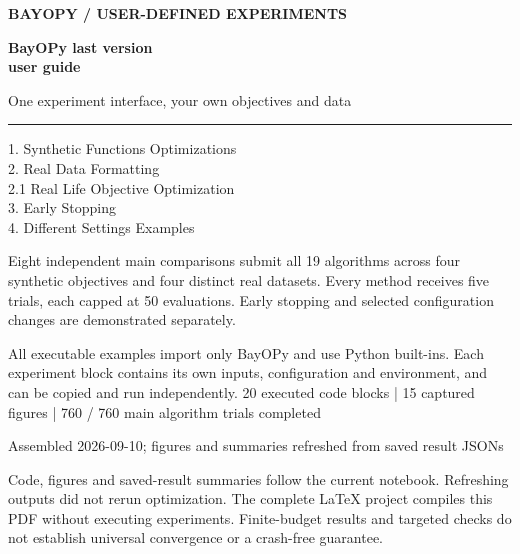 \documentclass[10pt,a4paper]{article}
\begin{document}
\begin{titlepage}
\vspace*{18mm}
{\small\bfseries\color{BayopyTeal}BAYOPY / USER-DEFINED EXPERIMENTS}\par
\vspace{12mm}
{\fontsize{34}{39}\selectfont\bfseries\color{BayopyInk}BayOPy last version\\user guide}\par
\vspace{5mm}
{\Large One experiment interface, your own objectives and data}\par
\vspace{9mm}
{\color{BayopyTeal}\rule{\linewidth}{2pt}}\par
\vspace{9mm}
1. Synthetic Functions Optimizations\\[5pt]
2. Real Data Formatting\\[5pt]
\hspace*{5mm}2.1 Real Life Objective Optimization\\[5pt]
3. Early Stopping\\[5pt]
4. Different Settings Examples
\vspace{9mm}

Eight independent main comparisons submit all 19 algorithms across four
synthetic objectives and four distinct real datasets. Every method receives
five trials, each capped at 50 evaluations. Early stopping and selected
configuration changes are demonstrated separately.

All executable examples import only BayOPy and use Python built-ins. Each
experiment block contains its own inputs, configuration and environment, and
can be copied and run independently.
\vfill
{\small\color{BayopyMuted}20 executed code blocks | 15 captured figures | 760 / 760 main algorithm trials completed}\par
{\small\color{BayopyMuted}Assembled 2026-09-10; figures and summaries refreshed from saved result JSONs}\par
{\small\color{BayopyMuted}Code, figures and saved-result summaries follow the current notebook.
Refreshing outputs did not rerun optimization. The complete LaTeX project compiles this PDF
without executing experiments. Finite-budget results and targeted checks do
not establish universal convergence or a crash-free guarantee.}\par
\end{titlepage}
\setcounter{tocdepth}{2}
\tableofcontents
\clearpage
\end{document}
